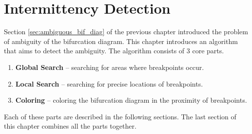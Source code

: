 \chapter{Intermittency Detection}
\label{chapter:intdetection}
Section \ref{sec:ambiguous_bif_diag} of the previous chapter introduced the problem of ambiguity of the bifurcation diagram.
This chapter introduces an algorithm that aims to detect the ambiguity.
The algorithm consists of 3 core parts.

\begin{enumerate}
	\item \textbf{Global Search} -- searching for areas where breakpoints occur.
	\item \textbf{Local Search} -- searching for precise locations of breakpoints.
	\item \textbf{Coloring} -- coloring the bifurcation diagram in the proximity of breakpoints.
\end{enumerate}

Each of these parts are described in the following sections.
The last section of this chapter combines all the parts together.

